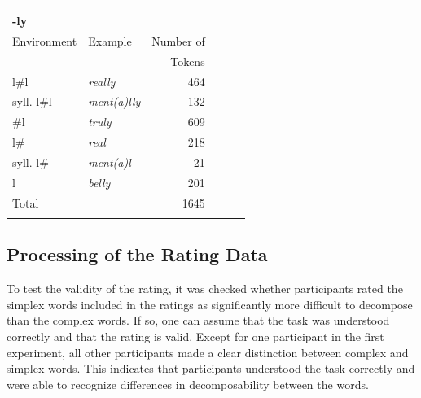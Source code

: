 \begin{table}[]
\begin{center}
{\begin{tabular} {llrllr}
			& & & \\
			\textbf{-ly}&&& & & \\
			\hline	%
			Environment & Example & Number of & & & \\
						 &  & Tokens & & & \\
			\hline
			l\#l &\color[HTML]{3166FF}\textit{really} & 464 & & & \\ 
			syll. l\#l &\color[HTML]{3166FF}\textit{ment(a)lly} & 132 & & & \\ 
			\#l &\color[HTML]{3166FF}\textit{truly} & 609& & & \\ 
			l\# &\color[HTML]{3166FF}\textit{real} & 218& & & \\ 
			syll. l\#&\color[HTML]{3166FF}\textit{ment(a)l} &21& & &\\ 
			l &\color[HTML]{3166FF}\textit{belly} & 201& & & \\ 
			\hline   	
			Total&  &1645 & & & \\ 

			\hline& & & 
		\end{tabular}
	}
	\end{center}
\end{table}



\subsection{Processing of the Rating Data} \label{Processing of the Rating Data}


To test the validity of the rating, it was checked whether participants rated the simplex words included in the ratings as significantly more difficult to decompose than the complex words. If so, one can assume that the task was understood correctly and that the rating is valid. 
Except for one participant in the first experiment, all other participants made a clear distinction between complex and simplex words. This indicates that participants understood the task correctly and were able to recognize differences in decomposability between the words.


